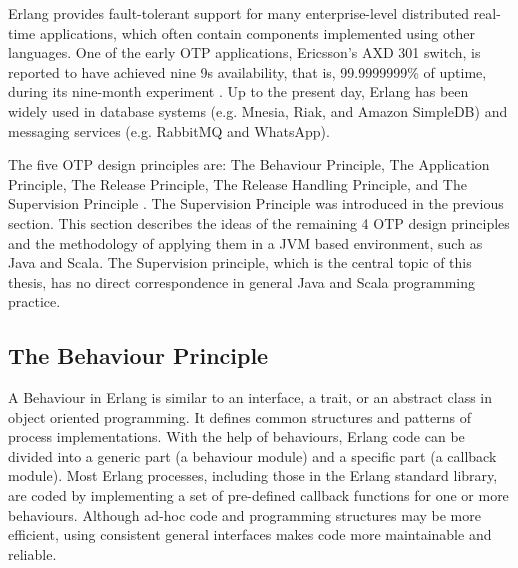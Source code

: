 Erlang provides fault-tolerant support for many enterprise-level distributed real-time
applications, which often contain components implemented using other languages.
One of the early OTP 
applications, Ericsson's AXD 301 switch, is reported to have achieved nine 9s 
availability, that is, 99.9999999\% of uptime, during its nine-month experiment 
\citep{ArmstrongAXD}.  Up to the present day, Erlang has been widely used in 
database systems (e.g. Mnesia, Riak, and Amazon SimpleDB) and messaging 
services (e.g. RabbitMQ and WhatsApp).


The five OTP design principles are: The Behaviour 
Principle, The Application Principle, The Release Principle, The Release 
Handling Principle, and The Supervision Principle \citep{OTP}.  The Supervision Principle 
was introduced in the previous section.  This section describes the ideas 
of the remaining 4 OTP design principles and the methodology of applying them 
in a JVM based environment, such as Java and Scala.  The Supervision principle, 
which is the central topic of this thesis, has no direct correspondence in 
general Java and Scala programming practice.



\subsection{The Behaviour Principle}

A Behaviour in Erlang is similar to an interface, a trait, or an abstract class
in object oriented programming.  It defines common structures and patterns of 
process implementations.  With the help of behaviours, Erlang code can be 
divided into a generic part (a behaviour module) and a specific part (a 
callback module).  Most Erlang processes, including those in the Erlang standard library,  are 
coded by implementing a set of pre-defined callback functions for one or 
more behaviours.  Although ad-hoc code and programming structures may be more 
efficient, using consistent general interfaces makes code more maintainable and 
reliable.  
\begin{comment}
Standard Erlang/OTP behaviours include: 

\begin{itemize} 
  \item $\it{gen\_server}$  for constructing the server of a client-server 
paradigm. 
  \item $\it{gen\_fsm}$ for constructing finite state machines. 
  \item $\it{gen\_event}$ for implementing event handling functionality. 
  \item $\it{supervisor}$ for implementing a supervisor in a supervision tree. 
\end{itemize}
\end{comment}


